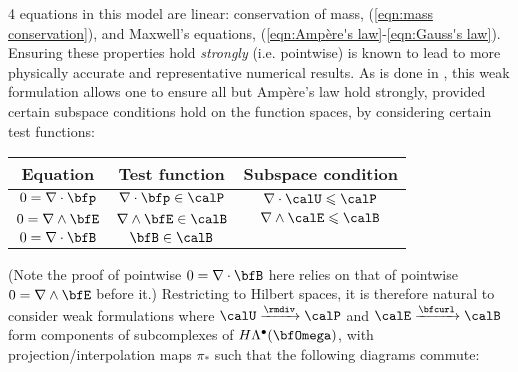      4 equations in this model are linear: conservation of mass, (\ref{eqn:mass conservation}), and Maxwell's equations, (\ref{eqn:Ampère's law}-\ref{eqn:Gauss's law}). Ensuring these properties hold \emph{strongly} (i.e. pointwise) is known to lead to more physically accurate and representative numerical results. \BA{[Ref, ...]}  As is done in \cite{LFM22}, this weak formulation allows one to ensure all but Ampère's law hold strongly, provided certain subspace conditions hold on the function spaces, by considering certain test functions: 
    \begin{center}\begin{tabular}{ c | c | c }
        Equation  &  Test function  &  Subspace condition  \\
        \hline\hline
        $0  =  \nabla\cdot\bfp$  &  $\nabla\cdot\bfp  \in  \calP$  &  $\nabla\cdot\calU  \leqslant  \calP$  \\
        $0  =  \nabla\wedge\bfE$  &  $\nabla\wedge\bfE  \in  \calB$  &  $\nabla\wedge\calE  \leqslant  \calB$  \\
        $0  =  \nabla\cdot\bfB$  &  $\bfB  \in  \calB$  &
    \end{tabular}\end{center}
    (Note the proof of pointwise $0  =  \nabla\cdot\bfB$ here relies on that of pointwise $0  =  \nabla\wedge\bfE$ before it.) Restricting to Hilbert spaces, it is therefore natural to consider weak formulations where $\calU \xrightarrow{\rmdiv} \calP$ and $\calE \xrightarrow{\bfcurl} \calB$ form components of subcomplexes of $H\Lambda^{\bullet}(\bfOmega)$, with projection/interpolation maps $\pi_{*}$ such that the following diagrams commute:
    \begin{center}\end{center}
